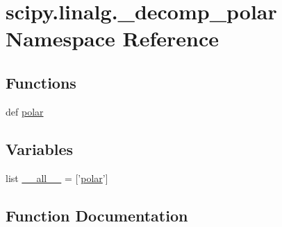 \hypertarget{namespacescipy_1_1linalg_1_1__decomp__polar}{}\section{scipy.\+linalg.\+\_\+decomp\+\_\+polar Namespace Reference}
\label{namespacescipy_1_1linalg_1_1__decomp__polar}
\subsection*{Functions}
\begin{DoxyCompactItemize}
\item 
def \hyperlink{namespacescipy_1_1linalg_1_1__decomp__polar_ad88c957fd03d7843a570e902829582b8}{polar}
\end{DoxyCompactItemize}
\subsection*{Variables}
\begin{DoxyCompactItemize}
\item 
list \hyperlink{namespacescipy_1_1linalg_1_1__decomp__polar_a3d389f0a4324d5696105a5ed2123ea00}{\+\_\+\+\_\+all\+\_\+\+\_\+} = \mbox{[}'\hyperlink{namespacescipy_1_1linalg_1_1__decomp__polar_ad88c957fd03d7843a570e902829582b8}{polar}'\mbox{]}
\end{DoxyCompactItemize}


\subsection{Function Documentation}
\hypertarget{namespacescipy_1_1linalg_1_1__decomp__polar_ad88c957fd03d7843a570e902829582b8}{}

